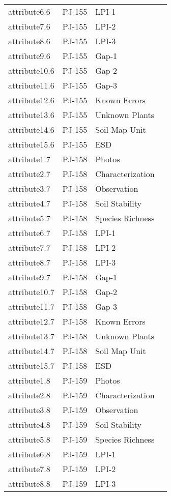 \documentclass[
]{article}
\begin{document}
\begin{longtable}[]{@{}llll@{}}
attribute6.6 & PJ-155 & LPI-1 & \\
attribute7.6 & PJ-155 & LPI-2 & \\
attribute8.6 & PJ-155 & LPI-3 & \\
attribute9.6 & PJ-155 & Gap-1 & \\
attribute10.6 & PJ-155 & Gap-2 & \\
attribute11.6 & PJ-155 & Gap-3 & \\
attribute12.6 & PJ-155 & Known Errors & \\
attribute13.6 & PJ-155 & Unknown Plants & \\
attribute14.6 & PJ-155 & Soil Map Unit & \\
attribute15.6 & PJ-155 & ESD & \\
attribute1.7 & PJ-158 & Photos & \\
attribute2.7 & PJ-158 & Characterization & \\
attribute3.7 & PJ-158 & Observation & \\
attribute4.7 & PJ-158 & Soil Stability & \\
attribute5.7 & PJ-158 & Species Richness & \\
attribute6.7 & PJ-158 & LPI-1 & \\
attribute7.7 & PJ-158 & LPI-2 & \\
attribute8.7 & PJ-158 & LPI-3 & \\
attribute9.7 & PJ-158 & Gap-1 & \\
attribute10.7 & PJ-158 & Gap-2 & \\
attribute11.7 & PJ-158 & Gap-3 & \\
attribute12.7 & PJ-158 & Known Errors & \\
attribute13.7 & PJ-158 & Unknown Plants & \\
attribute14.7 & PJ-158 & Soil Map Unit & \\
attribute15.7 & PJ-158 & ESD & \\
attribute1.8 & PJ-159 & Photos & \\
attribute2.8 & PJ-159 & Characterization & \\
attribute3.8 & PJ-159 & Observation & \\
attribute4.8 & PJ-159 & Soil Stability & \\
attribute5.8 & PJ-159 & Species Richness & \\
attribute6.8 & PJ-159 & LPI-1 & \\
attribute7.8 & PJ-159 & LPI-2 & \\
attribute8.8 & PJ-159 & LPI-3 & \\

\end{longtable}
\end{document}

